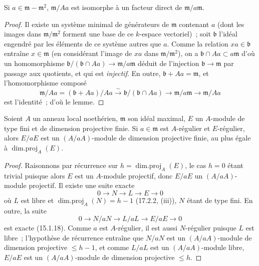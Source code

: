 \begin{lemma}[17.3.1.3]
\label{0.17.3.1.3-fr}
Si $a\in\mathfrak{m}-\mathfrak{m}^2$, $\mathfrak{m}/Aa$ est isomorphe à un
facteur direct de $\mathfrak{m}/a\mathfrak{m}$.
\end{lemma}

\begin{proof}
Il existe un système minimal de générateurs de $\mathfrak{m}$ contenant $a$
(dont les images dans $\mathfrak{m}/\mathfrak{m}^2$ forment une base de ce
$k$-espace vectoriel)~; soit $\mathfrak{b}$ l'idéal engendré par les éléments
de ce système autres que $a$. Comme la relation $xa\in\mathfrak{b}$ entraîne
$x\in\mathfrak{m}$ (en considérant l'image de $xa$ dans
$\mathfrak{m}/\mathfrak{m}^2$), on a
$\mathfrak{b}\cap Aa\subset a\mathfrak{m}$ d'où un homomorphisme
$\mathfrak{b}/(\mathfrak{b}\cap Aa)\longrightarrow
\mathfrak{m}/a\mathfrak{m}$ déduit de l'injection
$\mathfrak{b}\longrightarrow\mathfrak{m}$ par passage aux quotients, et qui
est \emph{injectif}. En outre, $\mathfrak{b}+Aa=\mathfrak{m}$, et
l'homomorphisme composé
\[
  \mathfrak{m}/Aa=(\mathfrak{b}+Aa)/Aa
  \xrightarrow{\sim}\mathfrak{b}/(\mathfrak{b}\cap Aa)
  \longrightarrow\mathfrak{m}/a\mathfrak{m}
  \longrightarrow\mathfrak{m}/Aa
\]
est l'identité~; d'où le lemme.
\end{proof}

\begin{lemma}[17.3.1.4]
\label{0.17.3.1.4-fr}
Soient $A$ un anneau local noethérien, $\mathfrak{m}$ son idéal maximal, $E$
un $A$-module de type fini et de dimension projective finie. Si
$a\in\mathfrak{m}$ est $A$-régulier et $E$-régulier, alors $E/aE$ est un
$(A/aA)$-module de dimension projective finie, au plus égale à
$\operatorname{dim.proj}_A(E)$.
\end{lemma}

\begin{proof}
Raisonnons par récurrence sur $h=\operatorname{dim.proj}_A(E)$, le cas $h=0$
étant trivial puisque alors $E$ est un $A$-module projectif, donc $E/aE$ un
$(A/aA)$-module projectif. Il existe une suite exacte
\[
  0\longrightarrow N\longrightarrow L\longrightarrow E\longrightarrow0
\]
où $L$ est libre et $\operatorname{dim.proj}_A(N)=h-1$ (17.2.2, (iii)), $N$
étant de type fini. En outre, la suite
\[
  0\longrightarrow N/aN\longrightarrow L/aL\longrightarrow E/aE
  \longrightarrow0
\]
est exacte (15.1.18). Comme $a$ est $A$-régulier, il est aussi $N$-régulier
puisque $L$ est libre~; l'hypothèse de récurrence entraîne que $N/aN$ est un
$(A/aA)$-module de dimension projective $\leq h-1$, et comme $L/aL$ est un
$(A/aA)$-module libre, $E/aE$ est un $(A/aA)$-module de dimension projective
$\leq h$.
\end{proof}

